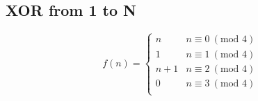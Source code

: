 \subsection{XOR from 1 to N}

$$
f(n) = \begin{cases}
    n & n \equiv 0\ (\text{mod } 4)\\
    1 & n \equiv 1\ (\text{mod } 4)\\
    n+1 & n \equiv 2\ (\text{mod } 4)\\
    0 & n \equiv 3\ (\text{mod } 4)\\
\end{cases}
$$
